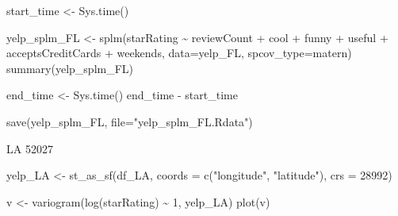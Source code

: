 \documentclass[
  12pt,
  letterpaper,
  DIV=11,
  numbers=noendperiod]{scrartcl}
\newenvironment{Shaded}{\begin{snugshade}}{\end{snugshade}}
\newcommand{\AttributeTok}[1]{\textcolor[rgb]{0.98,0.46,0.51}{#1}}
\newcommand{\DecValTok}[1]{\textcolor[rgb]{0.47,0.72,1.00}{#1}}
\newcommand{\FunctionTok}[1]{\textcolor[rgb]{0.70,0.57,0.94}{#1}}
\newcommand{\NormalTok}[1]{\textcolor[rgb]{0.88,0.89,0.91}{#1}}
\newcommand{\OtherTok}[1]{\textcolor[rgb]{0.70,0.57,0.94}{#1}}
\newcommand{\SpecialCharTok}[1]{\textcolor[rgb]{0.47,0.72,1.00}{#1}}
\newcommand{\StringTok}[1]{\textcolor[rgb]{0.62,0.80,1.00}{#1}}
\begin{document}
\begin{Shaded}
\begin{Highlighting}[]
\NormalTok{start\_time }\OtherTok{\textless{}{-}} \FunctionTok{Sys.time}\NormalTok{()}


\NormalTok{yelp\_splm\_FL }\OtherTok{\textless{}{-}} \FunctionTok{splm}\NormalTok{(starRating }\SpecialCharTok{\textasciitilde{}}\NormalTok{ reviewCount }\SpecialCharTok{+}\NormalTok{ cool }\SpecialCharTok{+}\NormalTok{ funny }\SpecialCharTok{+}\NormalTok{ useful }\SpecialCharTok{+}\NormalTok{ acceptsCreditCards }\SpecialCharTok{+}\NormalTok{ weekends, }\AttributeTok{data=}\NormalTok{yelp\_FL, }\AttributeTok{spcov\_type=}\StringTok{\textquotesingle{}matern\textquotesingle{}}\NormalTok{)}
\FunctionTok{summary}\NormalTok{(yelp\_splm\_FL)}

\NormalTok{end\_time }\OtherTok{\textless{}{-}} \FunctionTok{Sys.time}\NormalTok{()}
\NormalTok{end\_time }\SpecialCharTok{{-}}\NormalTok{ start\_time}
\end{Highlighting}
\end{Shaded}

\begin{Shaded}
\begin{Highlighting}[]
\FunctionTok{save}\NormalTok{(yelp\_splm\_FL, }\AttributeTok{file=}\StringTok{"yelp\_splm\_FL.Rdata"}\NormalTok{)}
\end{Highlighting}
\end{Shaded}

LA 52027

\begin{Shaded}
\begin{Highlighting}[]
\NormalTok{yelp\_LA }\OtherTok{\textless{}{-}} \FunctionTok{st\_as\_sf}\NormalTok{(df\_LA, }\AttributeTok{coords =} \FunctionTok{c}\NormalTok{(}\StringTok{"longitude"}\NormalTok{, }\StringTok{"latitude"}\NormalTok{), }\AttributeTok{crs =} \DecValTok{28992}\NormalTok{)}
\end{Highlighting}
\end{Shaded}

\begin{Shaded}
\begin{Highlighting}[]
\NormalTok{v }\OtherTok{\textless{}{-}} \FunctionTok{variogram}\NormalTok{(}\FunctionTok{log}\NormalTok{(starRating) }\SpecialCharTok{\textasciitilde{}} \DecValTok{1}\NormalTok{, yelp\_LA)}
\FunctionTok{plot}\NormalTok{(v)}
\end{Highlighting}
\end{Shaded}
\end{document}
